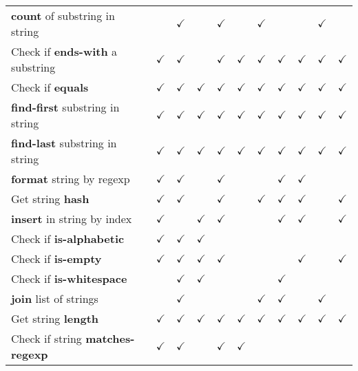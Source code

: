 \documentclass[anonymous,sigplan,review,11pt,nonacm,natbib=false]{acmart}
\begin{document}
\begin{table*}
\begin{tabular}{lllllllllll}
            \textbf{count} of substring in string & & $\checkmark$ & & $\checkmark$ & & $\checkmark$ & & & $\checkmark$ & \\
            Check if \textbf{ends-with} a substring & $\checkmark$ & $\checkmark$ & & $\checkmark$ & $\checkmark$ & $\checkmark$ & $\checkmark$ & $\checkmark$ & $\checkmark$ & $\checkmark$ \\
            Check if \textbf{equals} & $\checkmark$ & $\checkmark$ & $\checkmark$ & $\checkmark$ & $\checkmark$ & $\checkmark$ & $\checkmark$ & $\checkmark$ & $\checkmark$ & $\checkmark$ \\
            \textbf{find-first} substring in string & $\checkmark$ & $\checkmark$ & $\checkmark$ & $\checkmark$ & $\checkmark$ & $\checkmark$ & $\checkmark$ & $\checkmark$ & $\checkmark$ & $\checkmark$ \\
            \textbf{find-last} substring in string & $\checkmark$ & $\checkmark$ & $\checkmark$ & $\checkmark$ & $\checkmark$ & $\checkmark$ & $\checkmark$ & $\checkmark$ & $\checkmark$ & $\checkmark$ \\
            \textbf{format} string by regexp & $\checkmark$ & $\checkmark$ & & $\checkmark$ & & & $\checkmark$ & $\checkmark$ & & \\
            Get string \textbf{hash} & $\checkmark$ & $\checkmark$ & & $\checkmark$ & & $\checkmark$ & $\checkmark$ & $\checkmark$ & & $\checkmark$ \\
            \textbf{insert} in string by index & $\checkmark$ & & $\checkmark$ & $\checkmark$ & & & $\checkmark$ & $\checkmark$ & & $\checkmark$ \\
            Check if \textbf{is-alphabetic} & $\checkmark$ & $\checkmark$ & $\checkmark$ & & & & & & & \\
            Check if \textbf{is-empty} & $\checkmark$ & $\checkmark$ & $\checkmark$ & $\checkmark$ & & & & $\checkmark$ & & $\checkmark$ \\
            Check if \textbf{is-whitespace} & & $\checkmark$ & $\checkmark$ & & & & $\checkmark$ & & & \\
            \textbf{join} list of strings & & $\checkmark$ & & & & $\checkmark$ & $\checkmark$ & & $\checkmark$ & \\
            Get string \textbf{length} & $\checkmark$ & $\checkmark$ & $\checkmark$ & $\checkmark$ & $\checkmark$ & $\checkmark$ & $\checkmark$ & $\checkmark$ & $\checkmark$ & $\checkmark$ \\
            Check if string \textbf{matches-regexp} & $\checkmark$ & $\checkmark$ & & $\checkmark$ & $\checkmark$ & & & & & \\

\end{tabular}
\end{table*}
\end{document}
